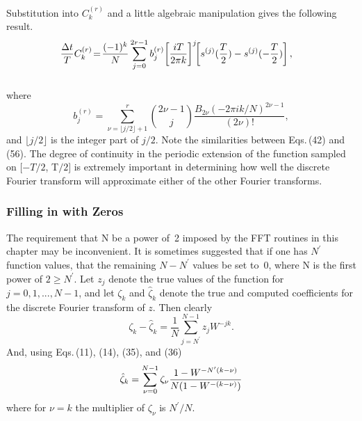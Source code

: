 \documentclass[twoside]{MATH77}
\begin{document}
Substitution into $C_k^{(r)}$ and a little algebraic manipulation gives the
following result.
\begin{equation}\label{O56}
\hspace{-10pt}\begin{array}{l}\displaystyle
\frac{\Delta t}TC_k^{(r)}\!=\!\frac{(-1)^k}%
N\sum_{j=0}^{2r-1}b_j^{(r)}\!\left[ \frac{iT}{2\pi k}\right] ^j\!\!\left[
s^{(j)}(\frac T2)-s^{(j)}(-\frac T2)\right],\\
~
\end{array}%
\end{equation}
where
\begin{equation}\label{O57}
b_j^{(r)}=\sum_{\nu =\lfloor j/2\rfloor +1}^r\binom{2\nu
-1}j\frac{B_{2\nu }(-2\pi ik/N)^{2\nu -1}}{(2\nu )!},
\end{equation}
and $\lfloor j/2\rfloor $ is the integer part of $j/2$. Note the similarities
between Eqs.\,(42) and (56). The degree of continuity in the periodic
extension of the function sampled on $[-T/2$, T$/2]$ is extremely important
in determining how well the discrete Fourier transform will approximate
either of the other Fourier transforms.

\subsubsection{Filling in with Zeros}

The requirement that N be a power of~2 imposed by the FFT routines in
this chapter may be inconvenient. It is sometimes suggested that if
one has $N^{\prime }$ function values, that the remaining
$N-N^{\prime }$ values be set to~0, where N is the first power of
$2\geq N^{\prime }$. Let $z_j$ denote the true values of the function
for $j=0,1,...,N-1$, and let $\zeta _k $ and $\hat \zeta _k$ denote
the true and computed coefficients for the discrete Fourier transform
of $z$. Then clearly
\begin{equation}\label{O58}
\zeta _k-\hat \zeta _k=\frac 1N\sum_{j=N^{\prime
}}^{N-1}z_jW^{-jk}.
\end{equation}
And, using Eqs.\,(11), (14), (35), and (36)
\begin{equation}\label{O59}
\hat \zeta _k=\sum_{\nu =0}^{N-1}\zeta _\nu \frac{%
1-W^{-N^{\prime }(k-\nu )}}{N(1-W^{-(k-\nu )})}
\end{equation}
where for $\nu =k$ the multiplier of $\zeta _\nu $ is $N^{\prime }/N.$
\end{document}
